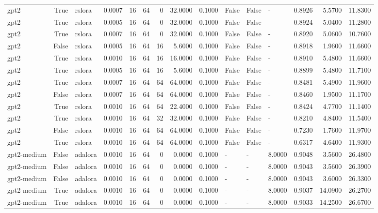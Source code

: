 \begin{tabular}{lrlrrrrrrlllrrr}
gpt2 & True & rslora & 0.0007 & 16 & 64 & 0 & 32.0000 & 0.1000 & False & False & - & 0.8926 & 5.5700 & 11.8300 \\
gpt2 & True & rslora & 0.0005 & 16 & 64 & 0 & 32.0000 & 0.1000 & False & False & - & 0.8924 & 5.0400 & 11.2800 \\
gpt2 & True & rslora & 0.0007 & 16 & 64 & 0 & 32.0000 & 0.1000 & False & False & - & 0.8920 & 5.0600 & 10.7600 \\
gpt2 & False & rslora & 0.0005 & 16 & 64 & 16 & 5.6000 & 0.1000 & False & False & - & 0.8918 & 1.9600 & 11.6600 \\
gpt2 & True & rslora & 0.0010 & 16 & 64 & 16 & 16.0000 & 0.1000 & False & False & - & 0.8910 & 5.4800 & 11.6600 \\
gpt2 & True & rslora & 0.0005 & 16 & 64 & 16 & 5.6000 & 0.1000 & False & False & - & 0.8899 & 5.4800 & 11.7100 \\
gpt2 & True & rslora & 0.0007 & 16 & 64 & 64 & 64.0000 & 0.1000 & False & False & - & 0.8481 & 5.4900 & 11.9600 \\
gpt2 & False & rslora & 0.0007 & 16 & 64 & 64 & 64.0000 & 0.1000 & False & False & - & 0.8460 & 1.9500 & 11.1700 \\
gpt2 & True & rslora & 0.0010 & 16 & 64 & 64 & 22.4000 & 0.1000 & False & False & - & 0.8424 & 4.7700 & 11.1400 \\
gpt2 & True & rslora & 0.0010 & 16 & 64 & 32 & 32.0000 & 0.1000 & False & False & - & 0.8210 & 4.8400 & 11.5400 \\
gpt2 & False & rslora & 0.0010 & 16 & 64 & 64 & 64.0000 & 0.1000 & False & False & - & 0.7230 & 1.7600 & 11.9700 \\
gpt2 & True & rslora & 0.0010 & 16 & 64 & 64 & 64.0000 & 0.1000 & False & False & - & 0.6317 & 4.6400 & 11.9300 \\
gpt2-medium & False & adalora & 0.0010 & 16 & 64 & 0 & 0.0000 & 0.1000 & - & - & 8.0000 & 0.9048 & 3.5600 & 26.4800 \\
gpt2-medium & False & adalora & 0.0010 & 16 & 64 & 0 & 0.0000 & 0.1000 & - & - & 8.0000 & 0.9043 & 3.5600 & 26.3900 \\
gpt2-medium & False & adalora & 0.0010 & 16 & 64 & 0 & 0.0000 & 0.1000 & - & - & 8.0000 & 0.9043 & 3.6000 & 26.3300 \\
gpt2-medium & True & adalora & 0.0010 & 16 & 64 & 0 & 0.0000 & 0.1000 & - & - & 8.0000 & 0.9037 & 14.0900 & 26.2700 \\
gpt2-medium & True & adalora & 0.0010 & 16 & 64 & 0 & 0.0000 & 0.1000 & - & - & 8.0000 & 0.9033 & 14.2500 & 26.6700 \\

\end{tabular}

